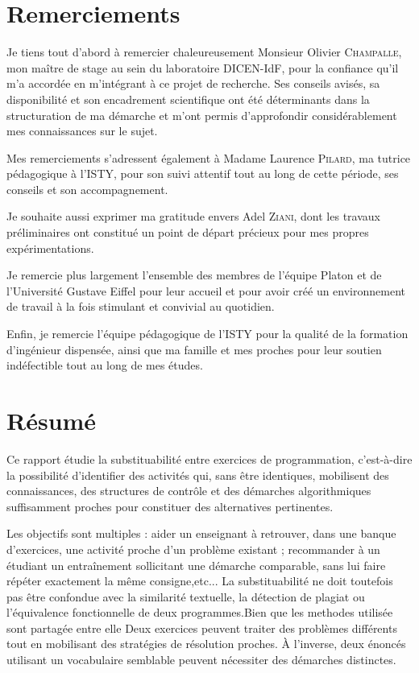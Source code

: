 \documentclass[12pt,a4paper,oneside]{report}
\begin{document}


\chapter*{Remerciements}
Je tiens tout d'abord à remercier chaleureusement Monsieur Olivier \textsc{Champalle}, mon maître de stage au sein du laboratoire DICEN-IdF, pour la confiance qu'il m'a accordée en m'intégrant à ce projet de recherche. Ses conseils avisés, sa disponibilité et son encadrement scientifique ont été déterminants dans la structuration de ma démarche et m'ont permis d'approfondir considérablement mes connaissances sur le sujet.

Mes remerciements s'adressent également à Madame Laurence \textsc{Pilard}, ma tutrice pédagogique à l'ISTY, pour son suivi attentif tout au long de cette période, ses conseils et son accompagnement.

Je souhaite aussi exprimer ma gratitude envers Adel \textsc{Ziani}, dont les travaux préliminaires ont constitué un point de départ précieux pour mes propres expérimentations. 

Je remercie plus largement l'ensemble des membres de l'équipe Platon et de l'Université Gustave Eiffel pour leur accueil et pour avoir créé un environnement de travail à la fois stimulant et convivial au quotidien.

Enfin, je remercie l'équipe pédagogique de l'ISTY pour la qualité de la formation d'ingénieur dispensée, ainsi que ma famille et mes proches pour leur soutien indéfectible tout au long de mes études.

\chapter*{Résumé}

Ce rapport étudie la substituabilité  entre exercices de
programmation, c'est-à-dire la possibilité d'identifier des activités qui,
sans être identiques, mobilisent des connaissances, des structures de
contrôle et des démarches algorithmiques suffisamment proches pour
constituer des alternatives pertinentes.

Les objectifs sont multiples  : aider un enseignant à retrouver, dans une banque
d'exercices, une activité proche d'un problème existant ; recommander à
un étudiant un entraînement sollicitant une démarche comparable, sans lui
faire répéter exactement la même consigne,etc... La substituabilité ne doit
toutefois pas être confondue avec la similarité textuelle, la détection de
plagiat ou l'équivalence fonctionnelle de deux programmes.Bien que les methodes utilisée sont partagée entre elle Deux exercices
peuvent traiter des problèmes différents tout en mobilisant des stratégies
de résolution proches. À l'inverse, deux énoncés utilisant un vocabulaire
semblable peuvent nécessiter des démarches distinctes.
\end{document}
